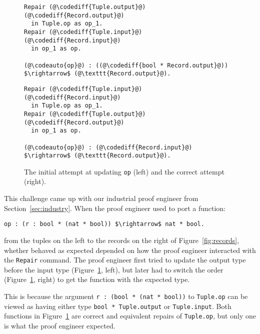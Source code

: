 \begin{figure}
\begin{minipage}{0.54\textwidth}
\begin{lstlisting}
Repair (@\codediff{Tuple.output}@) (@\codediff{Record.output}@) 
  in Tuple.op as op_1.
Repair (@\codediff{Tuple.input}@) (@\codediff{Record.input}@)
  in op_1 as op.

(@\codeauto{op}@) : ((@\codediff{bool * Record.output}@)) $\rightarrow$ (@\texttt{Record.output}@).
\end{lstlisting}
\end{minipage}
\hfill
\begin{minipage}{0.44\textwidth}
\begin{lstlisting}
Repair (@\codediff{Tuple.input}@) (@\codediff{Record.input}@)
  in Tuple.op as op_1.
Repair (@\codediff{Tuple.output}@) (@\codediff{Record.output}@)
  in op_1 as op.

(@\codeauto{op}@) : (@\codediff{Record.input}@) $\rightarrow$ (@\texttt{Record.output}@).
\end{lstlisting}
\end{minipage}
\caption{The initial attempt at updating \lstinline{op} (left) and the correct attempt (right).}
\label{fig:op}
\end{figure}

This challenge came up with our industrial proof engineer from Section~\ref{sec:industry}. %
When the proof engineer used \toolname to port a function:

\begin{lstlisting}
op : (r : bool * (nat * bool)) $\rightarrow$ nat * bool.
\end{lstlisting}
from the tuples on the left to the records on the right of Figure~\ref{fig:records},
whether \toolname behaved as expected depended on how the proof engineer interacted with the \lstinline{Repair} command.
The proof engineer first tried to update the output type before the input type (Figure~\ref{fig:op}, left),
but later had to switch the order (Figure~\ref{fig:op}, right) to get the function with the expected type.

This is because the argument \lstinline{r : (bool * (nat * bool))} to \lstinline{Tuple.op} can be viewed as 
having either type \lstinline{bool * Tuple.output} or \lstinline{Tuple.input}.
Both functions in Figure~\ref{fig:op} are correct and equivalent repairs of \lstinline{Tuple.op},
but only one is what the proof engineer expected.

